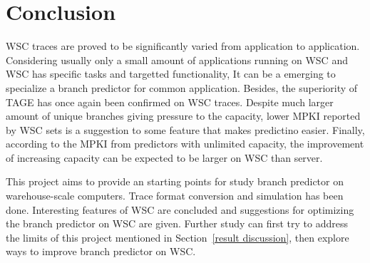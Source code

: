 \chapter{Conclusion}

\ifpdf
    \graphicspath{{Chapter3/Figs/Raster/}{Chapter3/Figs/PDF/}{Chapter3/Figs/}}
\else
    \graphicspath{{Chapter3/Figs/Vector/}{Chapter3/Figs/}}
\fi



WSC traces are proved to be significantly varied from application to application. Considering usually only a small amount of applications running on WSC and WSC has specific tasks and targetted functionality, It can be a emerging to specialize a branch predictor for common application. Besides, the superiority of TAGE has once again been confirmed on WSC traces. Despite much larger amount of unique branches giving pressure to the capacity, lower MPKI reported by WSC sets is a suggestion to some feature that makes predictino easier. Finally, according to the MPKI from predictors with unlimited capacity, the improvement of increasing capacity can be expected to be larger on WSC than server.\par\hspace*{\fill}\par

This project aims to provide an starting points for study branch predictor on warehouse-scale computers. Trace format conversion and simulation has been done. Interesting features of WSC are concluded and suggestions for optimizing the branch predictor on WSC are given. Further study can first try to address the limits of this project mentioned in Section~\ref{result discussion}, then explore ways to improve branch predictor on WSC.
